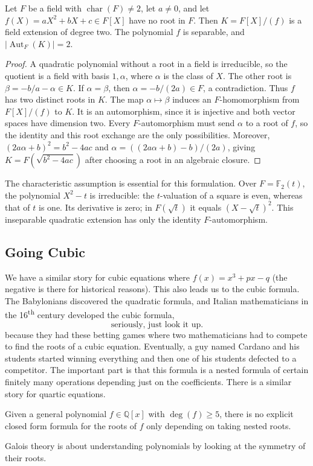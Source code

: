 \begin{proposition}
Let $F$ be a field with $\operatorname{char}(F)\ne2$, let $a\ne0$, and let
$f(X)=aX^2+bX+c\in F[X]$ have no root in $F$. Then
$K=F[X]/(f)$ is a field extension of degree two. The polynomial $f$ is separable,
and $|\operatorname{Aut}_F(K)|=2$.
\end{proposition}
\begin{proof}
A quadratic polynomial without a root in a field is irreducible, so the quotient
is a field with basis $1,\alpha$, where $\alpha$ is the class of $X$.
The other root is $\beta=-b/a-\alpha\in K$. If $\alpha=\beta$, then
$\alpha=-b/(2a)\in F$, a contradiction. Thus $f$ has two distinct roots in $K$.
The map $\alpha\mapsto\beta$ induces an $F$-homomorphism from $F[X]/(f)$ to $K$.
It is an automorphism, since it is injective and both vector spaces have dimension
two. Every $F$-automorphism must send $\alpha$ to a root of $f$, so the identity
and this root exchange are the only possibilities. Moreover,
$(2a\alpha+b)^2=b^2-4ac$ and $\alpha=((2a\alpha+b)-b)/(2a)$, giving
$K=F(\sqrt{b^2-4ac})$ after choosing a root in an algebraic closure.
\end{proof}
\begin{remark}
The characteristic assumption is essential for this formulation. Over
$F=\mathbb F_2(t)$, the polynomial $X^2-t$ is irreducible: the $t$-valuation
of a square is even, whereas that of $t$ is one. Its derivative is zero;
in $F(\sqrt t)$ it equals $(X-\sqrt t)^2$. This inseparable quadratic extension
has only the identity $F$-automorphism.
\end{remark}

\subsection{Going Cubic}

We have a similar story for cubic equations where $f(x) = x^3 + px - q$ (the negative is there for historical reasons). This also leads us to the cubic formula. The Babylonians discovered the quadratic formula, and Italian mathematicians in the 16\textsuperscript{th} century developed the cubic formula,
\[ \text{seriously, just look it up.} \]
because they had these betting games where two mathematicians had to compete to find the roots of a cubic equation. Eventually, a guy named Cardano and his students started winning everything and then one of his students defected to a competitor. The important part is that this formula is a nested formula of certain finitely many operations depending just on the coefficients. There is a similar story for quartic equations.

\begin{theorem}
Given a general polynomial $f \in \mathbb{Q}[x]$ with $\deg(f) \geq 5$, there is no explicit closed form formula for the roots of $f$ only depending on taking nested roots.
\end{theorem}

Galois theory is about understanding polynomials by looking at the symmetry of their roots.